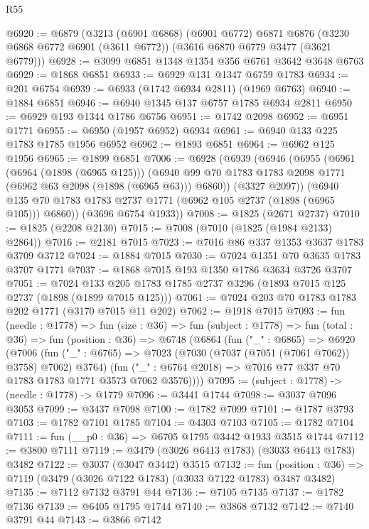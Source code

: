 \begin{lexlean}{R55}
\begin{coremodule}
@6920 := @6879
    (@3213
      (@6901 @6868)
      (@6901 @6772)
      @6871
      @6876
      (@3230 @6868 @6772 @6901 (@3611 @6772))
      (@3616 @6870 @6779 @3477 (@3621 @6779)))
@6928 := @3099 @6851 @1348 @1354 @356 @6761 @3642 @3648 @6763
@6929 := @1868 @6851
@6933 := @6929 @131 @1347 @6759 @1783
@6934 := @201 @6754
@6939 := @6933 (@1742 @6934 @2811) (@1969 @6763)
@6940 := @1884 @6851
@6946 := @6940 @1345 @137 @6757 @1785 @6934 @2811
@6950 := @6929 @193 @1344 @1786 @6756
@6951 := @1742 @2098
@6952 := @6951 @1771
@6955 := @6950 (@1957 @6952) @6934
@6961 := @6940 @133 @225 @1783 @1785 @1956 @6952
@6962 := @1893 @6851
@6964 := @6962 @125 @1956
@6965 := @1899 @6851
@7006 := @6928
    (@6939
      (@6946
        (@6955
          (@6961
            (@6964 (@1898 (@6965 @125)))
            (@6940 @99 @70 @1783 @1783 @2098 @1771 (@6962 @63 @2098 (@1898 (@6965 @63))) @6860))
          (@3327 @2097))
        (@6940 @135 @70 @1783 @1783 @2737 @1771 (@6962 @105 @2737 (@1898 (@6965 @105))) @6860))
      (@3696 @6754 @1933))
@7008 := @1825 (@2671 @2737)
@7010 := @1825 (@2208 @2130)
@7015 := @7008 (@7010 (@1825 (@1984 @2133) @2864))
@7016 := @2181 @7015
@7023 := @7016 @86 @337 @1353 @3637 @1783 @3709 @3712
@7024 := @1884 @7015
@7030 := @7024 @1351 @70 @3635 @1783 @3707 @1771
@7037 := @1868 @7015 @193 @1350 @1786 @3634 @3726 @3707
@7051 := @7024 @133 @205 @1783 @1785 @2737 @3296 (@1893 @7015 @125 @2737 (@1898 (@1899 @7015 @125)))
@7061 := @7024 @203 @70 @1783 @1783 @202 @1771 (@3170 @7015 @11 @202)
@7062 := @1918 @7015
@7093 := fun (needle : @1778) =>
  fun (size : @36) =>
  fun (subject : @1778) =>
  fun (total : @36) =>
  fun (position : @36) =>
  @6748
    (@6864
      (fun ("_" : @6865) =>
      @6920
        (@7006
          (fun ("_" : @6765) => @7023 (@7030 (@7037 (@7051 (@7061 @7062)) @3758) @7062) @3764)
          (fun ("_" : @6764 @2018) => @7016 @77 @337 @70 @1783 @1783 @1771 @3573 @7062 @3576))))
@7095 := (subject : @1778) -> (needle : @1778) -> @1779
@7096 := @3441 @1744
@7098 := @3037 @7096 @3053
@7099 := @3437 @7098
@7100 := @1782 @7099
@7101 := @1787 @3793
@7103 := @1782 @7101 @1785
@7104 := @4303 @7103
@7105 := @1782 @7104
@7111 := fun (__p0 : @36) => @6705 @1795 @3442 @1933 @3515 @1744
@7112 := @3800 @7111
@7119 := @3479 (@3026 @6413 @1783) (@3033 @6413 @1783) @3482
@7122 := @3037 (@3047 @3442) @3515
@7132 := fun (position : @36) => @7119 (@3479 (@3026 @7122 @1783) (@3033 @7122 @1783) @3487 @3482)
@7135 := @7112 @7132 @3791 @44
@7136 := @7105 @7135
@7137 := @1782 @7136
@7139 := @6405 @1795 @1744
@7140 := @3868 @7132
@7142 := @7140 @3791 @44
@7143 := @3866 @7142

\end{coremodule}
\end{lexlean}
